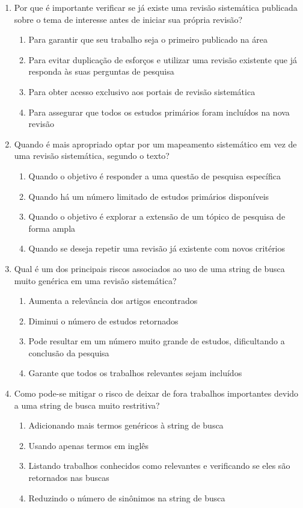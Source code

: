 \documentclass{article}
\begin{document}
\begin{enumerate}
\item Por que é importante verificar se já existe uma revisão sistemática publicada sobre o tema de interesse antes de iniciar sua própria revisão?
\begin{enumerate}
\item Para garantir que seu trabalho seja o primeiro publicado na área
\item Para evitar duplicação de esforços e utilizar uma revisão existente que já responda às suas perguntas de pesquisa
\item Para obter acesso exclusivo aos portais de revisão sistemática
\item Para assegurar que todos os estudos primários foram incluídos na nova revisão
\end{enumerate}

\item Quando é mais apropriado optar por um mapeamento sistemático em vez de uma revisão sistemática, segundo o texto?
\begin{enumerate}
\item Quando o objetivo é responder a uma questão de pesquisa específica
\item Quando há um número limitado de estudos primários disponíveis
\item Quando o objetivo é explorar a extensão de um tópico de pesquisa de forma ampla
\item Quando se deseja repetir uma revisão já existente com novos critérios
\end{enumerate}

\item Qual é um dos principais riscos associados ao uso de uma string de busca muito genérica em uma revisão sistemática?
\begin{enumerate}
\item  Aumenta a relevância dos artigos encontrados
\item  Diminui o número de estudos retornados
\item  Pode resultar em um número muito grande de estudos, dificultando a conclusão da pesquisa
\item  Garante que todos os trabalhos relevantes sejam incluídos
\end{enumerate}

\item Como pode-se mitigar o risco de deixar de fora trabalhos importantes devido a uma string de busca muito restritiva?
\begin{enumerate}
\item  Adicionando mais termos genéricos à string de busca
\item  Usando apenas termos em inglês
\item  Listando trabalhos conhecidos como relevantes e verificando se eles são retornados nas buscas
\item  Reduzindo o número de sinônimos na string de busca
\end{enumerate}


\end{enumerate}
\end{document}
